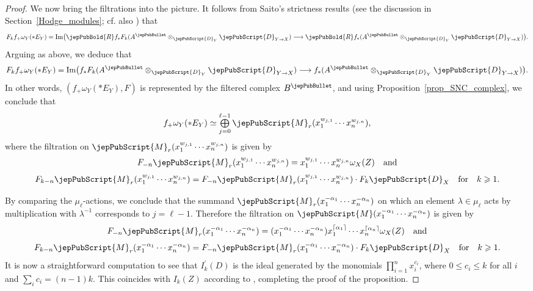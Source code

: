 \begin{proof}
We now bring the filtrations into the picture. It follows from Saito's strictness results (see the discussion in 
Section~\ref{Hodge_modules}; cf. also \cite[\S4,~\S6]{MP1}) that 
$$F_kf_+\omega_Y(*E_Y)={\rm Im}\big(\jepPubBold{R} f_*F_k(A^{\jepPubBullet}\otimes_{\jepPubScript{D}_Y}\jepPubScript{D}_{Y\to X})\longrightarrow \jepPubBold{R} f_*(A^{\jepPubBullet}\otimes_{\jepPubScript{D}_Y}\jepPubScript{D}_{Y\to X})\big).$$
Arguing as above, we deduce that 
$$F_kf_+\omega_Y(*E_Y)={\rm Im}\big(f_*F_k(A^{\jepPubBullet}\otimes_{\jepPubScript{D}_Y}\jepPubScript{D}_{Y\to X})\longrightarrow f_*(A^{\jepPubBullet}\otimes_{\jepPubScript{D}_Y}\jepPubScript{D}_{Y\to X})\big).$$
In other words, $(f_+\omega_Y(*E_Y), F)$ is represented by the filtered complex $B^{\jepPubBullet}$, and using Proposition~\ref{prop_SNC_complex},
we conclude that 
$$f_+\omega_Y(*E_Y)\simeq \mathop{\textstyle\bigoplus}\limits_{j=0}^{\ell-1}\jepPubScript{M}_r(x_1^{w_{j,1}}\cdots x_n^{w_{j,n}}),$$
where the filtration on $\jepPubScript{M}_r(x_1^{w_{j,1}}\cdots x_n^{w_{j,n}})$ is given by 
$$F_{-n}\jepPubScript{M}_r(x_1^{w_{j,1}}\cdots x_n^{w_{j,n}})=x_1^{w_{j,1}}\cdots x_n^{w_{j,n}}\omega_X(Z)\quad\text{and}$$
$$F_{k-n}\jepPubScript{M}_r(x_1^{w_{j,1}}\cdots x_n^{w_{j,n}})=F_{-n}\jepPubScript{M}_r(x_1^{w_{j,1}}\cdots x_n^{w_{j,n}})\cdot F_k\jepPubScript{D}_X\quad\text{for}\quad k\geqslant 1.$$

By comparing the $\mu_{\ell}$-actions, we conclude that the summand 
$\jepPubScript{M}_r(x_1^{-\alpha_1}\cdots x_n^{-\alpha_n})$ on which an element $\lambda\in\mu_{\ell}$ acts by multiplication with $\lambda^{-1}$
corresponds to $j=\ell-1$. Therefore the filtration on 
$\jepPubScript{M}(x_1^{-\alpha_1}\cdots x_n^{-\alpha_n})$ is given by
$$F_{-n}\jepPubScript{M}_r(x_1^{-\alpha_1}\cdots x_n^{-\alpha_n})=(x_1^{-\alpha_1}\cdots x_n^{-\alpha_n})x_1^{\lceil\alpha_1\rceil}\cdots x_n^{\lceil\alpha_n\rceil}\omega_X(Z)\quad\text{and}$$
$$F_{k-n}\jepPubScript{M}_r(x_1^{-\alpha_1}\cdots x_n^{-\alpha_n})=F_{-n}\jepPubScript{M}_r(x_1^{-\alpha_1}\cdots x_n^{-\alpha_n})\cdot F_k\jepPubScript{D}_X\quad\text{for}\quad k\geqslant 1.$$
It is now a straightforward computation to see that
$I_k^\prime(D)$ is the ideal generated by the monomials $\prod_{i=1}^nx_i^{c_i}$, where $0\leqslant c_i\leqslant k$ for all $i$ and $\sum_ic_i=(n-1)k$. 
This coincides with $I_k (Z)$ according to \cite[Prop.~8.2]{MP1},
completing the proof of the proposition.
\end{proof}







